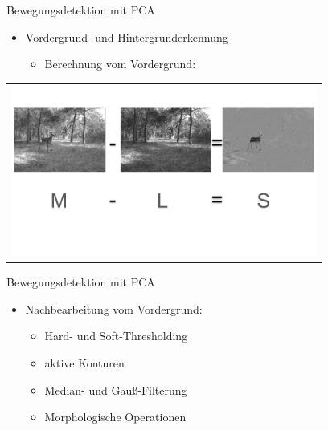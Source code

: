 \begin{frame}[t,fragile]{Bewegungsdetektion mit PCA}
	\begin{itemize}
 \item Vordergrund- und Hintergrunderkennung
 \begin{itemize}
        \item{Berechnung vom Vordergrund:}
      \end{itemize}
  \end{itemize}

  \vspace{0.01em}
  {
\begin{table}
\centering
        \begin{tabular}{c}
        \includegraphics[width=10cm]{img/Segmentierung/foreground-image}
         \end{tabular}
        
\end{table}
 }
\end{frame}

\begin{frame}[t,fragile]{Bewegungsdetektion mit PCA}
	\begin{itemize}
 \item{Nachbearbeitung vom Vordergrund:}
 \begin{itemize}
        \item{Hard- und  Soft-Thresholding}
		\item{aktive Konturen}
		\item{Median- und Gauß-Filterung}
 		\item{Morphologische Operationen}
      \end{itemize}
  \end{itemize}
\end{frame}


